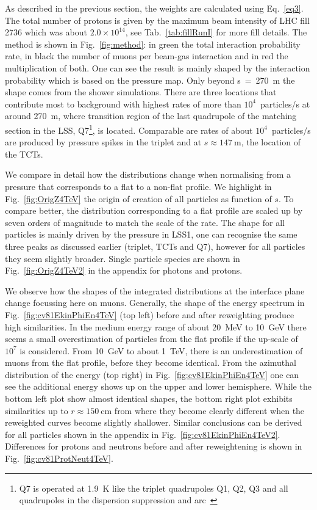 As described in the previous section, the weights are calculated using Eq.~\ref{eq3}. The total number of protons is given by the maximum beam intensity of LHC fill 2736 which was about $2.0 \times 10^{14}$, see Tab.~\ref{tab:fillRunI} for more fill details. The method is shown in Fig.~\ref{fig:method}: in green the total interaction probability rate, in black the number of muons per beam-gas interaction and in red the multiplication of both. One can see the result is mainly shaped by the interaction probability which is based on the pressure map. Only beyond s~=~270~m the shape comes from the shower simulations. There are three locations that contribute most to background with highest rates of more than $10^4$~particles/s at around 270~m, where transition region of the last quadrupole of the matching section in the LSS, Q7\footnote{Q7 is operated at 1.9~K like the triplet quadrupoles Q1, Q2, Q3 and all quadrupoles in the dispersion suppression and arc~\cite{LHCDesignRep}}, is located. Comparable are rates of about $10^4$~particles/s are produced by pressure spikes in the triplet and at $s \approx 147~$m, the location of the TCTs.

We compare in detail how the distributions change when normalising from a pressure that corresponds to a flat to a non-flat profile. We highlight in Fig.~\ref{fig:OrigZ4TeV} the origin of creation of all particles as function of $s$. To compare better, the distribution corresponding to a flat profile are scaled up by seven orders of magnitude to match the scale of the rate. The shape for all particles is mainly driven by the pressure in LSS1, one can recognise the same three peaks as discussed earlier (triplet, TCTs and Q7), however for all particles they seem slightly broader. Single particle species are shown in Fig.~\ref{fig:OrigZ4TeV2} in the appendix for photons and protons. 

We observe how the shapes of the integrated distributions at the interface plane change focussing here on muons. Generally, the shape of the energy spectrum in Fig.~\ref{fig:cv81EkinPhiEn4TeV} (top left) before and after reweighting produce high similarities. In the medium energy range of about 20~MeV to 10~GeV there seems a small overestimation of particles from the flat profile if the up-scale of $10^{7}$ is considered. From 10~GeV to about 1~TeV, there is an underestimation of muons from the flat profile, before they become identical. From the azimuthal distribution of the energy (top right) in Fig.~\ref{fig:cv81EkinPhiEn4TeV} one can see the additional energy shows up on the upper and lower hemisphere. While the bottom left plot show almost identical shapes, the bottom right plot exhibits similarities up to $r \approx 150~$cm from where they become clearly different when the reweighted curves become slightly shallower. Similar conclusions can be derived for all particles shown in the appendix in Fig.~\ref{fig:cv81EkinPhiEn4TeV2}. Differences for protons and neutrons before and after reweightening is shown in Fig.~\ref{fig:cv81ProtNeut4TeV}.

